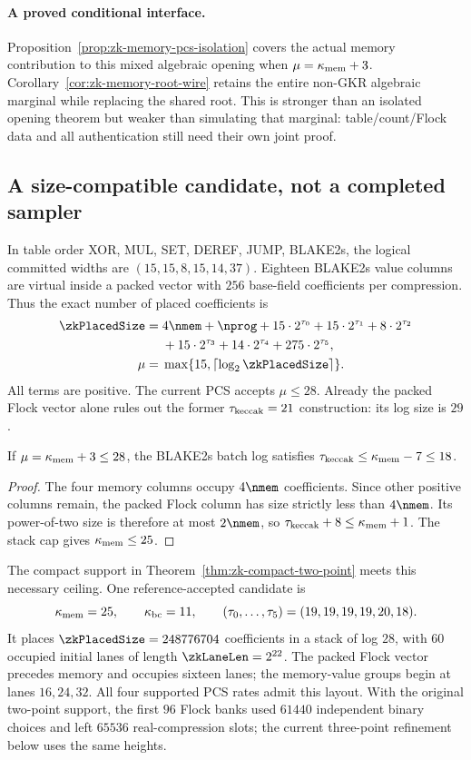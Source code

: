 \paragraph{A proved conditional interface.} Proposition~\ref{prop:zk-memory-pcs-isolation} covers the actual memory contribution to this mixed algebraic opening when $\mu=\kappa_{\mathrm{mem}}+3$. Corollary~\ref{cor:zk-memory-root-wire} retains the entire non-GKR algebraic marginal while replacing the shared root. This is stronger than an isolated opening theorem but weaker than simulating that marginal: table/count/Flock data and all authentication still need their own joint proof.

\subsection{A size-compatible candidate, not a completed sampler}

In table order XOR, MUL, SET, DEREF, JUMP, BLAKE2s, the logical committed widths are $(15,15,8,15,14,37)$. Eighteen BLAKE2s value columns are virtual inside a packed vector with $256$ base-field coefficients per compression. Thus the exact number of placed coefficients is
\[
 \begin{aligned}
 \zkPlacedSize={}&4\nmem+\nprog
 +15\cdot2^{\tau_0}+15\cdot2^{\tau_1}
 +8\cdot2^{\tau_2}\\
 &+15\cdot2^{\tau_3}+14\cdot2^{\tau_4}+275\cdot2^{\tau_5},\\
 \mu={}&\max\{15,\lceil\log_2\zkPlacedSize\rceil\}.
 \end{aligned}
\]
All terms are positive. The current PCS accepts $\mu\le28$. Already the packed Flock vector alone rules out the former $\tau_{\mathrm{keccak}}=21$ construction: its log size is $29$.

\begin{proposition}\label{prop:zk-flock-capacity}
If $\mu=\kappa_{\mathrm{mem}}+3\le28$, the BLAKE2s batch log satisfies $\tau_{\mathrm{keccak}}\le\kappa_{\mathrm{mem}}-7\le18$.
\end{proposition}
\begin{proof}
The four memory columns occupy $4\nmem$ coefficients. Since other positive columns remain, the packed Flock column has size strictly less than $4\nmem$. Its power-of-two size is therefore at most $2\nmem$, so $\tau_{\mathrm{keccak}}+8\le\kappa_{\mathrm{mem}}+1$. The stack cap gives $\kappa_{\mathrm{mem}}\le25$.
\end{proof}

The compact support in Theorem~\ref{thm:zk-compact-two-point} meets this necessary ceiling. One reference-accepted candidate is
\[
 \kappa_{\mathrm{mem}}=25,\qquad \kappa_{\mathrm{bc}}=11,\qquad
 (\tau_0,\ldots,\tau_5)=(19,19,19,19,20,18).
\]
It places $\zkPlacedSize=248776704$ coefficients in a stack of log $28$, with $60$ occupied initial lanes of length $\zkLaneLen=2^{22}$. The packed Flock vector precedes memory and occupies sixteen lanes; the memory-value groups begin at lanes $16,24,32$. All four supported PCS rates admit this layout. With the original two-point support, the first $96$ Flock banks used $61440$ independent binary choices and left $65536$ real-compression slots; the current three-point refinement below uses the same heights.

